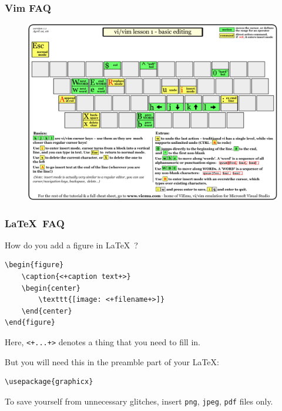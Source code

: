 \documentclass[hyperref={colorlinks=false},handout,10pt]{beamer}
\def\LaTeXs{\LaTeX\ }
\begin{document}
\begin{frame}
    \frametitle{Vim FAQ}
    \begin{figure}
        \begin{center}
            \includegraphics[width=\textwidth]{images/vi-vim-tutorial-1.png}
        \end{center}
    \end{figure}
\end{frame}

\begin{frame}[fragile]
    \frametitle{\LaTeXs FAQ}
    \begin{block}{How do you add a figure in \LaTeXs?}
    \begin{lstlisting}
\begin{figure}
    \caption{<+caption text+>}
    \begin{center}
        \texttt{[image: <+filename+>]}
    \end{center}
\end{figure}
    \end{lstlisting}
     Here, \verb$<+...+>$ denotes a thing that you need to fill in.
    \end{block}
    \begin{block}{But you will need this in the preamble part of your \LaTeX:}
    \begin{lstlisting}
\usepackage{graphicx} 
    \end{lstlisting}
    To save yourself from unnecessary glitches, insert \texttt{png},
    \texttt{jpeg}, \texttt{pdf} files only.
    \end{block}
\end{frame}
\end{document}
